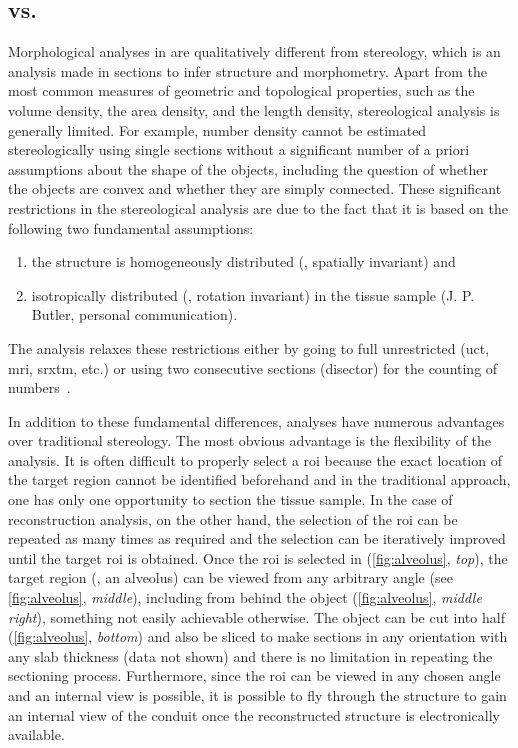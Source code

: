 \subsection{\twod vs. \threed}
Morphological analyses in \threed are qualitatively different from stereology, which is an analysis made in \twod sections to infer \threed structure and morphometry. Apart from the most common measures of geometric and topological properties, such as the volume density, the area density, and the length density, stereological analysis is generally limited. For example, number density cannot be estimated stereologically using single sections without a significant number of a priori assumptions about the shape of the objects, including the question of whether the objects are convex and whether they are simply connected. These significant restrictions in the stereological analysis are due to the fact that it is based on the following two fundamental assumptions: 
\begin{enumerate}
	\item the structure is homogeneously distributed (\ie, spatially invariant) and 
	\item isotropically distributed (\ie, rotation invariant) in the tissue sample (J. P. Butler, personal communication). 
\end{enumerate}
The \threed analysis relaxes these restrictions either by going to full unrestricted \threed (\ac{uct}, \ac{mri}, \ac{srxtm}, etc.) or using two consecutive sections (disector) for the counting of numbers~\cite{Hyde2007}.

In addition to these fundamental differences, \threed analyses have numerous advantages over traditional stereology. The most obvious advantage is the flexibility of the analysis. It is often difficult to properly select a \ac{roi} because the exact location of the target region cannot be identified beforehand and in the traditional approach, one has only one opportunity to section the tissue sample. In the case of \threed reconstruction analysis, on the other hand, the selection of the \ac{roi} can be repeated as many times as required and the selection can be iteratively improved until the target \ac{roi} is obtained. Once the \ac{roi} is selected in \threed (\autoref{fig:alveolus}, \emph{top}), the target region (\eg, an alveolus) can be viewed from any arbitrary angle (see \autoref{fig:alveolus}, \emph{middle}), including from behind the object (\autoref{fig:alveolus}, \emph{middle right}), something not easily achievable otherwise. The \threed object can be cut into half (\autoref{fig:alveolus}, \emph{bottom}) and also be sliced to make \twod sections in any orientation with any slab thickness (data not shown) and there is no limitation in repeating the sectioning process. Furthermore, since the \ac{roi} can be viewed in any chosen angle and an internal view is possible, it is possible to fly through the structure to gain an internal view of the conduit once the \threed reconstructed structure is electronically available.

